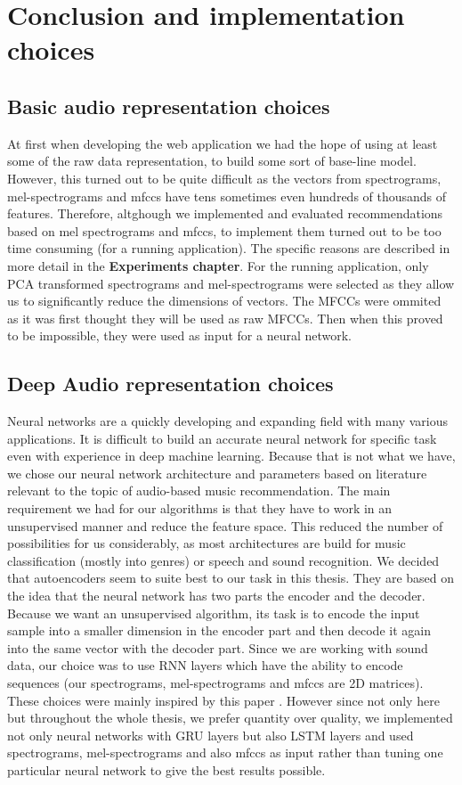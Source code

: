 \section{Conclusion and implementation choices}

\subsection{Basic audio representation choices}
At first when developing the web application we had the hope of using at least some of the raw data representation, to build some sort of base-line model. However, this turned out to be quite difficult as the vectors from spectrograms, mel-spectrograms and mfccs have tens sometimes even hundreds of thousands of features. Therefore, altghough we implemented and evaluated recommendations based on mel spectrograms and mfccs, to implement them turned out to be too time consuming (for a running application). The specific reasons are described in more detail in the \textbf{Experiments chapter}. For the running application, only PCA transformed spectrograms and mel-spectrograms were selected as they allow us to significantly reduce the dimensions of vectors. The MFCCs were ommited as it was first thought they will be used as raw MFCCs. Then when this proved to be impossible, they were used as input for a neural network.

\subsection{Deep Audio representation choices}
Neural networks are a quickly developing and expanding field with many various applications. It is difficult to build an accurate neural network for specific task even with experience in deep machine learning. Because that is not what we have, we chose our neural network architecture and parameters based on literature relevant to the topic of audio-based music recommendation. The main requirement we had for our algorithms is that they have to work in an unsupervised manner and reduce the feature space. This reduced the number of possibilities for us considerably, as most architectures are build for music classification (mostly into genres) or speech and sound recognition. We decided that autoencoders seem to suite best to our task in this thesis. They are based on the idea that the neural network has two parts the encoder and the decoder. Because we want an unsupervised algorithm, its task is to encode the input sample into a smaller dimension in the encoder part and then decode it again into the same vector with the decoder part. Since we are working with sound data, our choice was to use RNN layers which have the ability to encode sequences (our spectrograms, mel-spectrograms and mfccs are 2D matrices). These choices were mainly inspired by this paper \cite{inproceedings_RNNs}. However since not only here but throughout the whole thesis, we prefer quantity over quality, we implemented not only neural networks with GRU layers but also LSTM layers and used spectrograms, mel-spectrograms and also mfccs as input rather than tuning one particular neural network to give the best results possible. 
